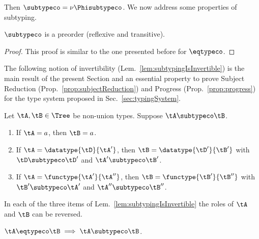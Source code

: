 Then $\mathbin{\subtypeco} = \nu\Phisubtypeco$. We now address some properties
of subtyping.

\begin{lemma}
$\subtypeco$ is a preorder (\ie reflexive and transitive).
\end{lemma}

\begin{proof}
This proof is similar to the one presented before for $\eqtypeco$.
\end{proof}



The following notion of invertibility (Lem.~\ref{lem:subtypingIsInvertible}) is
the main result of the present Section and an essential property to prove
Subject Reduction (Prop.~\ref{prop:subjectReduction}) and Progress
(Prop.~\ref{prop:progress}) for the type system proposed in
Sec.~\ref{sec:typingSystem}.

\begin{lemma}
\label{lem:subtypingIsInvertible}
Let $\tA, \tB \in \Tree$ be non-union types. Suppose $\tA \subtypeco \tB$.
\begin{enumerate}
  \item If $\tA = a$, then $\tB = a$.
  \item If $\tA = \datatype{\tD}{\tA'}$, then $\tB = \datatype{\tD'}{\tB'}$
  with $\tD \subtypeco \tD'$ and $\tA' \subtypeco \tB'$.
  \item If $\tA = \functype{\tA'}{\tA''}$, then $\tB = \functype{\tB'}{\tB''}$
  with $\tB' \subtypeco \tA'$ and $\tA'' \subtypeco \tB''$.
\end{enumerate}
\end{lemma}

\begin{remark}
In each of the three items of Lem.~\ref{lem:subtypingIsInvertible} the roles of
$\tA$ and $\tB$ can be reversed. 
\end{remark}





\begin{lemma}
\label{lem:eqImpliesSub}
$\tA \eqtypeco \tB \implies \tA \subtypeco \tB$.
\end{lemma}

